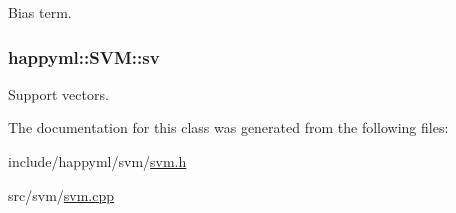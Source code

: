 Bias term. 

\subsubsection[{\texorpdfstring{sv}{sv}}]{ happyml\+::\+S\+V\+M\+::sv\hspace{0.3cm}{\ttfamily [protected]}}\hypertarget{classhappyml_1_1SVM_aa6fca9de47d16e821964229f660a8cdd}{}\label{classhappyml_1_1SVM_aa6fca9de47d16e821964229f660a8cdd}


Support vectors. 



The documentation for this class was generated from the following files\+:\begin{DoxyCompactItemize}
\item 
include/happyml/svm/\hyperlink{svm_8h}{svm.\+h}\item 
src/svm/\hyperlink{svm_8cpp}{svm.\+cpp}\end{DoxyCompactItemize}

